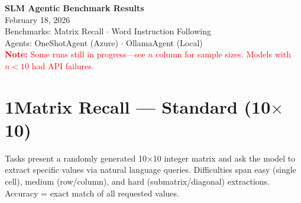 \documentclass[11pt,letterpaper]{article}
\begin{document}
\begin{center}
{\LARGE \textbf{SLM Agentic Benchmark Results}}\\[4pt]
{\large February 18, 2026}\\[6pt]
{\small\textcolor{notegray}{Benchmarks: Matrix Recall $\cdot$ Word Instruction Following}}\\[2pt]
{\small\textcolor{notegray}{Agents: OneShotAgent (Azure) $\cdot$ OllamaAgent (Local)}}\\[2pt]
{\small\textcolor{red}{\textbf{Note:} Some runs still in progress---see $n$ column for sample sizes. Models with $n < 10$ had API failures.}}
\end{center}

\vspace{0.4cm}

\section*{1\quad Matrix Recall --- Standard (10$\times$10)}

Tasks present a randomly generated 10$\times$10 integer matrix and ask the model to extract specific values via natural language queries. Difficulties span easy (single cell), medium (row/column), and hard (submatrix/diagonal) extractions. Accuracy = exact match of all requested values.

\vspace{0.3cm}
\end{document}

